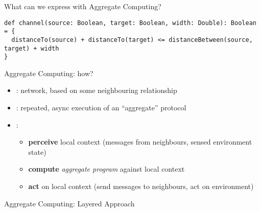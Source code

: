\documentclass[8pt, aspectratio=169, handout]{beamer}
\begin{document}
\begin{frame}{What can we express with Aggregate Computing?}
  \centering
  \begin{card}
    \begin{verbatim}
def channel(source: Boolean, target: Boolean, width: Double): Boolean = {
  distanceTo(source) + distanceTo(target) <= distanceBetween(source, target) + width
}
    \end{verbatim}
  \end{card}
\end{frame}
\begin{frame}{Aggregate Computing: how?}
  \begin{card}[Requirements]
    \begin{itemize}
      \item {}: network, based on some neighbouring relationship
      \item {}: repeated, async execution of an ``aggregate'' protocol    
    \end{itemize}
  \end{card}
  \begin{card}
    \begin{itemize}
      \item[\success{\faInfo}] :
      \begin{itemize}
        \item [\highlight{1-}] \textbf{perceive} local context (messages from neighbours, sensed environment state) 
        \item [\highlight{2-}] \textbf{compute} \emph{aggregate program} against local context
        \item [\highlight{3-}] \textbf{act} on local context (send messages to neighbours, act on environment)
      \end{itemize}
    \end{itemize}
  \end{card}
\end{frame}
\begin{frame}{Aggregate Computing: Layered Approach}
  \centering
\end{frame}
\end{document}
